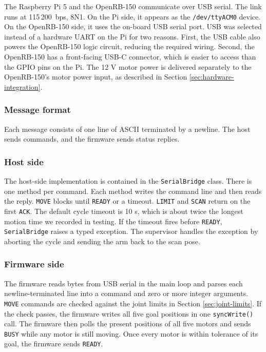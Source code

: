 \label{sec:comm}
The Raspberry Pi 5 and the OpenRB-150 communicate over USB serial. The
link runs at 115\,200~bps, 8N1. On the Pi side, it appears as the
\texttt{/dev/ttyACM0} device. On the OpenRB-150 side, it uses the
on-board USB serial port.
USB was selected instead of a hardware UART on the Pi for two reasons.
First, the USB cable also powers the OpenRB-150 logic circuit, reducing
the required wiring. Second, the OpenRB-150 has a front-facing USB-C
connector, which is easier to access than the GPIO pins on the Pi. The
12 V motor power is delivered separately to the OpenRB-150's motor power
input, as described in Section \ref{sec:hardware-integration}.
\subsubsection*{Message format}
Each message consists of one line of ASCII terminated by a newline. The
host sends commands, and the firmware sends status replies.
\subsubsection*{Host side}
The host-side implementation is contained in the \texttt{SerialBridge}
class. There is one method per command. Each method writes the command
line and then reads the reply.
\texttt{MOVE} blocks until \texttt{READY} or a timeout. \texttt{LIMIT}
and \texttt{SCAN} return on the first \texttt{ACK}. The default cycle
timeout is 10 s, which is about twice the longest motion time we
recorded in testing. If the timeout fires before \texttt{READY},
\texttt{SerialBridge} raises a typed exception. The supervisor handles
the exception by aborting the cycle and sending the arm back to the
scan pose.
\subsubsection*{Firmware side}
The firmware reads bytes from USB serial in the main loop and parses
each newline-terminated line into a command and zero or more integer
arguments. \texttt{MOVE} commands are checked against the joint limits
in Section \ref{sec:joint-limits}. If the check passes, the firmware
writes all five goal positions in one \texttt{syncWrite()} call. The
firmware then polls the present positions of all five motors and
sends \texttt{BUSY} while any motor is still moving. Once every motor
is within tolerance of its goal, the firmware sends \texttt{READY}.
